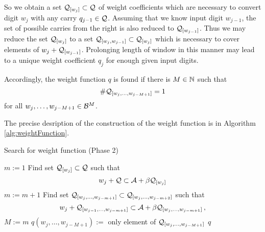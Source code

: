     So we obtain a set $\mathcal{Q}_{[w_j]}\subset\mathcal{Q}$ of weight coefficients which are necessary to convert digit $w_j$ with any carry $q_{j-1}\in\mathcal{Q}$. Assuming that we know input digit $w_{j-1}$, the set of possible carries from the right is also reduced to $\mathcal{Q}_{[w_{j-1}]}$. Thus we may reduce the set $\mathcal{Q}_{[w_j]}$ to a set $\mathcal{Q}_{[w_j,w_{j-1}]}\subset \mathcal{Q}_{[w_j]}$ which is necessary to cover elements of $w_j + \mathcal{Q}_{[w_{j-1}]}$. Prolonging length of window in this manner may lead to a unique weight coefficient $q_j$ for enough given input digits.  
    
    Accordingly, the weight function $q$ is found if there is $M\in\mathbb{N}$ such that 
    $$
    \#\mathcal{Q}_{[w_{j},\dots, w_{j-M+1}]}=1
    $$
    for all $w_{j},\dots, w_{j-M+1} \in \mathcal{B}^M$.
    
    The precise desription of the construction of the weight function is in  Algorithm \ref{alg:weightFunction}.
\begin{algorithm}
  \caption{Search for weight function (Phase 2)}
    \label{alg:weightFunction}
  \begin{algorithmic}[1]
    \STATE $m:=1$
        \STATE Find set $\mathcal{Q}_{[w_j]} \subset \mathcal{Q}$ such that
          $$
          w_j + \mathcal{Q} \subset \mathcal{A} + \beta \mathcal{Q}_{[w_j]}
          $$
    \ENDFOR
        \STATE $m:= m +1$
            \STATE Find set $\mathcal{Q}_{[w_j,\dots, w_{j-m+1}]} \subset \mathcal{Q}_{[w_j,\dots, w_{j-m+2}]}$ such that
              $$
              w_j + \mathcal{Q}_{[w_{j-1},\dots, w_{j-m+1}]} \subset \mathcal{A} + \beta \mathcal{Q}_{[w_j,\dots, w_{j-m+1}]}\,,
              $$
        \ENDFOR  
    \ENDWHILE  
    \STATE $M:= m$ 
        \STATE $q(w_j,\dots, w_{j-M+1}):=$ only element of $\mathcal{Q}_{[w_j,\dots, w_{j-M+1}]}$
    \ENDFOR
    \RETURN $q$
  \end{algorithmic}
\end{algorithm}
    
